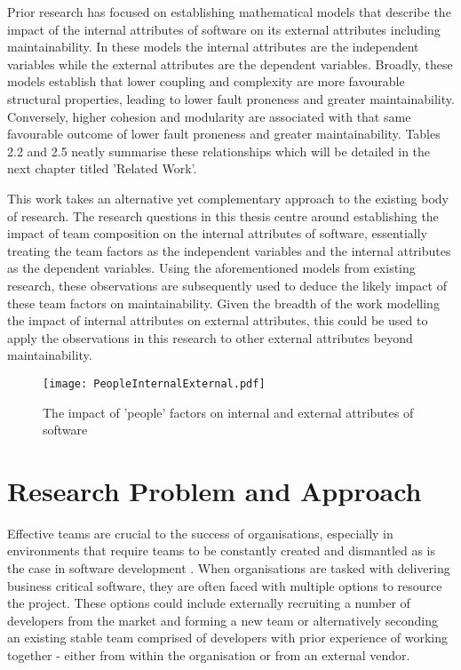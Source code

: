 Prior research has focused on establishing mathematical models that describe the impact of the internal attributes of software on its external attributes including maintainability. In these models the internal attributes are the independent variables while the external attributes are the dependent variables. Broadly, these models establish that lower coupling and complexity are more favourable structural properties, leading to lower fault proneness and greater maintainability. Conversely, higher cohesion and modularity are associated with that same favourable outcome of lower fault proneness and greater maintainability. Tables 2.2 and 2.5 neatly summarise these relationships which will be detailed in the next chapter titled 'Related Work'. 

This work takes an alternative yet complementary approach to the existing body of research. The research questions in this thesis centre around establishing the impact of team composition on the internal attributes of software, essentially treating the team factors as the independent variables and the internal attributes as the dependent variables. Using the aforementioned models from existing research, these observations are subsequently used to deduce the likely impact of these team factors on maintainability. Given the breadth of the work modelling the impact of internal attributes on external attributes, this could be used to apply the observations in this research to other external attributes beyond maintainability.

\begin{figure}[htbp!] 
\centering    
\texttt{[image: PeopleInternalExternal.pdf]}
\caption[The impact of 'people' factors on internal and external attributes of software]{The impact of 'people' factors on internal and external attributes of software}
\label{fig:PeopleInternalExternal}
\end{figure}

\section{Research Problem and Approach} %
Effective teams are crucial to the success of organisations, especially in environments that require teams to be constantly created and dismantled as is the case in software development \citep{andrejczuk2017synergistic}. When organisations are tasked with delivering business critical software, they are often faced with multiple options to resource the project. These options could include externally recruiting a number of developers from the market and forming a new team or alternatively seconding an existing stable team comprised of developers with prior experience of working together - either from within the organisation or from an external vendor. 

